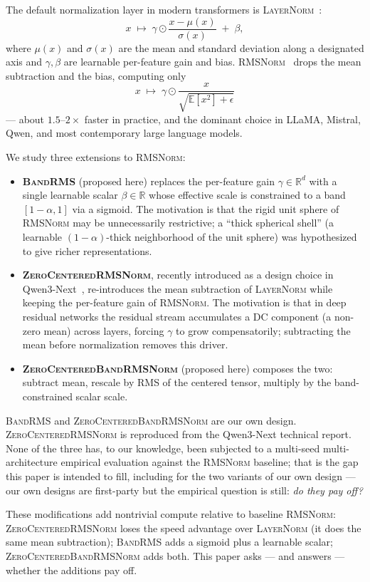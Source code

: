 \documentclass{article}
\newcommand{\R}{\mathbb{R}}
\newcommand{\E}{\mathbb{E}}
\newcommand{\rms}{\textsc{RMSNorm}}
\newcommand{\bandrms}{\textsc{BandRMS}}
\newcommand{\zcrms}{\textsc{ZeroCentered}\-\textsc{RMSNorm}}
\newcommand{\zcband}{\textsc{ZeroCentered}\-\textsc{BandRMSNorm}}
\newcommand{\layernorm}{\textsc{LayerNorm}}
\begin{document}
The default normalization layer in modern transformers is \layernorm{}~\citep{ba2016layer}:
$$x \;\mapsto\; \gamma \odot \frac{x - \mu(x)}{\sigma(x)} \;+\; \beta,$$
where $\mu(x)$ and $\sigma(x)$ are the mean and standard deviation along a designated axis and $\gamma, \beta$ are learnable per-feature gain and bias.
\rms{}~\citep{zhang2019root} drops the mean subtraction and the bias, computing only
$$x \;\mapsto\; \gamma \odot \frac{x}{\sqrt{\E[x^2] + \epsilon}}$$
--- about $1.5$--$2\times$ faster in practice, and the dominant choice in LLaMA, Mistral, Qwen, and most contemporary large language models.

We study three extensions to \rms{}:
\begin{itemize}
  \item \textbf{\bandrms{}} (proposed here) replaces the per-feature gain $\gamma \in \R^d$ with a single learnable scalar $\beta \in \R$ whose effective scale is constrained to a band $[1-\alpha, 1]$ via a sigmoid. The motivation is that the rigid unit sphere of \rms{} may be unnecessarily restrictive; a ``thick spherical shell'' (a learnable $(1{-}\alpha)$-thick neighborhood of the unit sphere) was hypothesized to give richer representations.
  \item \textbf{\zcrms{}}, recently introduced as a design choice in Qwen3-Next~\citep{qwen3next2025}, re-introduces the mean subtraction of \layernorm{} while keeping the per-feature gain of \rms{}. The motivation is that in deep residual networks the residual stream accumulates a DC component (a non-zero mean) across layers, forcing $\gamma$ to grow compensatorily; subtracting the mean before normalization removes this driver.
  \item \textbf{\zcband{}} (proposed here) composes the two: subtract mean, rescale by RMS of the centered tensor, multiply by the band-constrained scalar scale.
\end{itemize}

\bandrms{} and \zcband{} are our own design.
\zcrms{} is reproduced from the Qwen3-Next technical report.
None of the three has, to our knowledge, been subjected to a multi-seed multi-architecture empirical evaluation against the \rms{} baseline; that is the gap this paper is intended to fill, including for the two variants of our own design --- our own designs are first-party but the empirical question is still: \emph{do they pay off?}

These modifications add nontrivial compute relative to baseline \rms{}: \zcrms{} loses the speed advantage over \layernorm{} (it does the same mean subtraction); \bandrms{} adds a sigmoid plus a learnable scalar; \zcband{} adds both.
This paper asks --- and answers --- whether the additions pay off.
\end{document}
